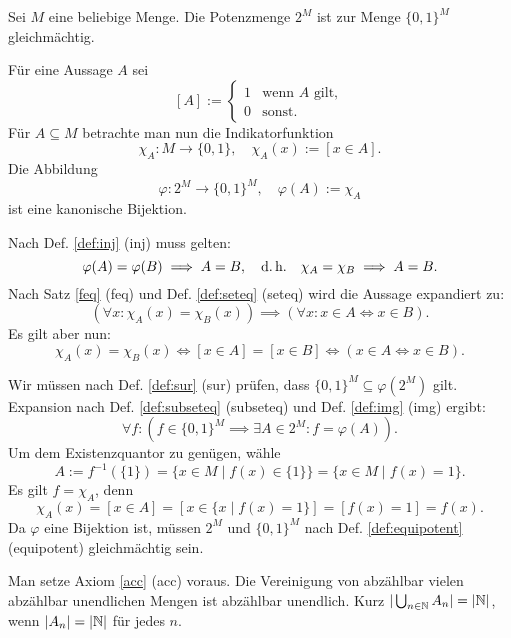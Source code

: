 \begin{Satz}
Sei $M$ eine beliebige Menge. Die Potenzmenge $2^M$ ist zur
Menge $\{0,1\}^M$ gleichmächtig.
\end{Satz}

\begin{Beweis}
Für eine Aussage $A$ sei
\[[A] := \begin{cases}
1&\text{wenn $A$ gilt},\\
0&\text{sonst}.
\end{cases}\]
Für $A\subseteq M$ betrachte man nun die
Indikatorfunktion
\[\chi_A\colon M\to\{0,1\},\quad \chi_A(x):=[x\in A].\]
Die Abbildung
\[\varphi\colon 2^M\to \{0,1\}^M,\quad \varphi(A):=\chi_A\]
ist eine kanonische Bijektion.

Nach Def. \ref{def:inj} (inj) muss gelten:
\[\varphi(A)=\varphi(B)\implies A=B,\quad\text{d.\,h.}\quad
\chi_A=\chi_B \implies A=B.\]
Nach Satz \ref{feq} (feq) und Def. \ref{def:seteq} (seteq)
wird die Aussage expandiert zu:
\[(\forall x\colon \chi_A(x)=\chi_B(x))\implies
(\forall x\colon x\in A\iff x\in B).\]
Es gilt aber nun:
\[\chi_A(x)=\chi_B(x)\iff [x\in A]=[x\in B] \iff (x\in A\iff x\in B).\]
\end{Beweis}
 Wir müssen nach Def. \ref{def:sur} (sur)
prüfen, dass $\{0,1\}^M\subseteq \varphi(2^M)$ gilt.
Expansion nach Def. \ref{def:subseteq} (subseteq) und
Def. \ref{def:img} (img)
ergibt:
\[\forall f\colon (f\in \{0,1\}^M\implies\exists A{\in}2^M\colon f=\varphi(A)).\]
Um dem Existenzquantor zu genügen, wähle
\[A := f^{-1}(\{1\}) = \{x\in M\mid f(x)\in \{1\}\} = \{x\in M\mid f(x)=1\}.\]
Es gilt $f=\chi_A$, denn
\[\chi_A(x) = [x\in A] = [x\in\{x\mid f(x)=1\}] = [f(x)=1] = f(x).\]
Da $\varphi$ eine Bijektion ist, müssen $2^M$ und $\{0,1\}^M$
nach Def. \ref{def:equipotent} (equipotent) gleichmächtig
sein.\,\qedsymbol

\newpage
\begin{Satz}\label{countable-union-countable}
Man setze Axiom \ref{acc} (acc) voraus.
Die Vereinigung von abzählbar vielen abzählbar unendlichen Mengen
ist abzählbar unendlich. Kurz $|\bigcup_{n\in\mathbb N} A_n| = |\mathbb N|$, wenn
$|A_n|=|\mathbb N|$ für jedes $n$.
\end{Satz}

